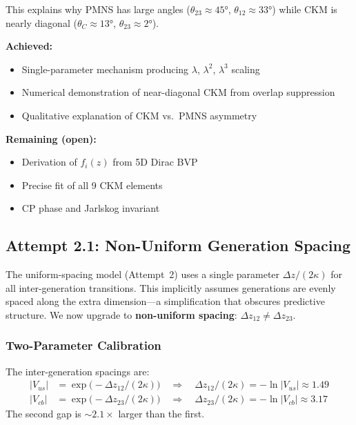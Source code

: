 This explains why PMNS has large angles ($\theta_{23} \approx 45°$, $\theta_{12} \approx 33°$)
while CKM is nearly diagonal ($\theta_C \approx 13°$, $\theta_{23} \approx 2°$).

\begin{tcolorbox}[colback=orange!5, colframe=orange!50!black,
    title=\textbf{Attempt 2 Status: YELLOW}]
\textbf{Achieved:}
\begin{itemize}[nosep]
    \item Single-parameter mechanism producing $\lambda$, $\lambda^2$, $\lambda^3$ scaling \tagDc{}
    \item Numerical demonstration of near-diagonal CKM from overlap suppression \tagDc{}
    \item Qualitative explanation of CKM vs.\ PMNS asymmetry \tagI{}
\end{itemize}
\textbf{Remaining (open):}
\begin{itemize}[nosep]
    \item Derivation of $f_i(z)$ from 5D Dirac BVP
    \item Precise fit of all 9 CKM elements
    \item CP phase and Jarlskog invariant
\end{itemize}
\end{tcolorbox}

\subsection{Attempt 2.1: Non-Uniform Generation Spacing}
\label{sec:ch7_attempt2_1}

The uniform-spacing model (Attempt~2) uses a single parameter $\Delta z/(2\kappa)$
for all inter-generation transitions. This implicitly assumes generations are
evenly spaced along the extra dimension---a simplification that obscures
predictive structure. We now upgrade to \textbf{non-uniform spacing}:
$\Delta z_{12} \neq \Delta z_{23}$.

\subsubsection{Two-Parameter Calibration}

\begin{postulate}
\label{post:ch7_nonuniform}
The inter-generation spacings are:
\begin{align}
    |V_{us}| &= \exp\bigl(-\Delta z_{12}/(2\kappa)\bigr)
    \quad\Rightarrow\quad \Delta z_{12}/(2\kappa) = -\ln|V_{us}| \approx 1.49
    \label{eq:ch7_d12_cal} \\
    |V_{cb}| &= \exp\bigl(-\Delta z_{23}/(2\kappa)\bigr)
    \quad\Rightarrow\quad \Delta z_{23}/(2\kappa) = -\ln|V_{cb}| \approx 3.17
    \label{eq:ch7_d23_cal}
\end{align}
The second gap is $\sim 2.1\times$ larger than the first.
\end{postulate}

